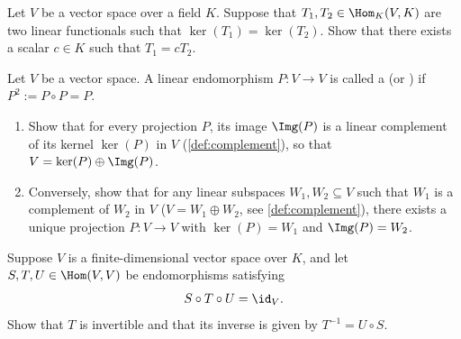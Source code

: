 \begin{exercise}
\label{exc:functionals_same_kernel_proportional}
Let $V$ be a vector space over a field $K$. Suppose that $T_1, T_2 \in \Hom_K(V, K)$ are two linear functionals such that $\ker(T_1) = \ker(T_2)$. Show that there exists a scalar $c \in K$ such that $T_1 = c T_2$.
\end{exercise}

\begin{exercise}
\label{exc:projections_and_complements}
Let $V$ be a vector space. A linear endomorphism $P \colon V \to V$ is called a  (or ) if $P^2 := P \circ P = P$.
\begin{enumerate}[label=\textbf{(\alph*)}]
    \item Show that for every projection $P$, its image $\Img(P)$ is a linear complement of its kernel $\ker(P)$ in $V$ (\cref{def:complement}), so that $V = \ker(P) \oplus \Img(P)$.
    \item Conversely, show that for any linear subspaces $W_1, W_2 \subseteq V$ such that $W_1$ is a complement of $W_2$ in $V$ ($V = W_1 \oplus W_2$, see \cref{def:complement}), there exists a unique projection $P \colon V \to V$ with $\ker(P) = W_1$ and $\Img(P) = W_2$.
\end{enumerate}
\end{exercise}

\begin{exercise}
\label{exc:invertibility_three_map_composition}
Suppose $V$ is a finite-di\-men\-sional vector space over $K$, and let $S, T, U \in \Hom(V, V)$ be endomorphisms satisfying
\[
S \circ T \circ U = \id_V.
\]
Show that $T$ is invertible and that its inverse is given by $T^{-1} = U \circ S$.
\end{exercise}

